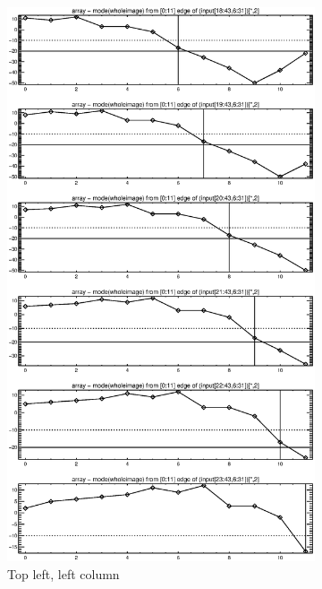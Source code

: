 \documentclass[10pt]{article}
\begin{document}
\begin{figure}[!h]
    \centering 
    \hspace{-1.0in}
    \begin{subfigure}[b]{.4\linewidth}
        \centering
        \includegraphics[width=1.4\textwidth]{plots_tables_images/topleft0.eps} 
        \caption{Top left, left column}
    \end{subfigure}
    \hspace{1.0in}
    \begin{subfigure}[b]{.4\linewidth}

\end{subfigure}
\end{figure}
\end{document}
